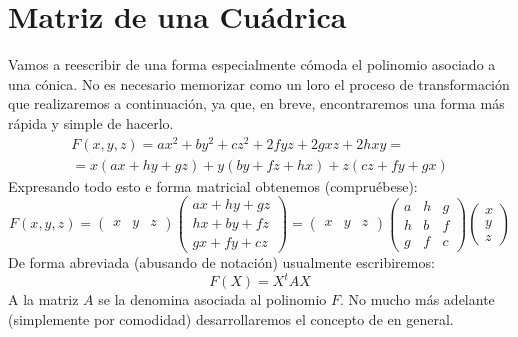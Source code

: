 \section{Matriz de una Cuádrica}
Vamos a reescribir de una forma especialmente cómoda el polinomio asociado a una cónica. No es necesario memorizar como un loro el proceso de transformación que realizaremos a continuación, ya que, en breve, encontraremos una forma más rápida y simple de hacerlo.
\begin{multline}
	F(x,y,z)=ax^2+by^2+cz^2+2fyz+2gxz+2hxy=\\
	=x(ax+hy+gz)+y(by+fz+hx)+z(cz+fy+gx)
\end{multline}
Expresando todo esto e forma matricial obtenemos (compruébese):
\[F(x,y,z)=\begin{pmatrix}
x & y & z
\end{pmatrix}\begin{pmatrix}
ax+hy+gz\\
hx+by+fz\\
gx+fy+cz
\end{pmatrix}=\begin{pmatrix}
x & y & z
\end{pmatrix}\begin{pmatrix}
a & h & g\\
h & b & f\\
g & f & c
\end{pmatrix}\begin{pmatrix}
x\\
y\\
z
\end{pmatrix}\]
De forma abreviada (abusando de notación) usualmente escribiremos:
\[F(X)=X^tAX\]
A la matriz $A$ se la denomina  asociada al polinomio $F$. No mucho más adelante (simplemente por comodidad) desarrollaremos el concepto de  en general.


